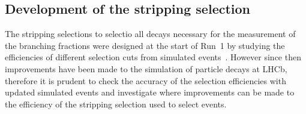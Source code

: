  



\subsection{Development of the stripping selection}
\label{strippingold}

The stripping selections to selectio all decays necessary for the measurement of the \bmumu branching fractions were designed at the start of Run~1 by studying the efficiencies of different selection cuts from simulated events~\cite{Diego}. However since then improvements have been made to the simulation of particle decays at LHCb, therefore it is prudent to check the accuracy of the selection efficiencies with updated simulated events and investigate where improvements can be made to the efficiency of the stripping selection used to select \bmumu events.



